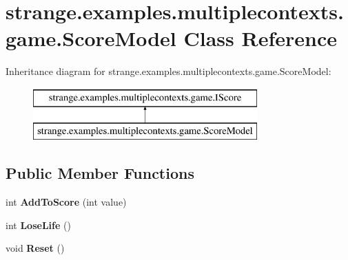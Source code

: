 \hypertarget{classstrange_1_1examples_1_1multiplecontexts_1_1game_1_1_score_model}{\section{strange.\-examples.\-multiplecontexts.\-game.\-Score\-Model Class Reference}
\label{classstrange_1_1examples_1_1multiplecontexts_1_1game_1_1_score_model}
}
Inheritance diagram for strange.\-examples.\-multiplecontexts.\-game.\-Score\-Model\-:\begin{figure}[H]
\begin{center}
\leavevmode
\includegraphics[height=2.000000cm]{classstrange_1_1examples_1_1multiplecontexts_1_1game_1_1_score_model}
\end{center}
\end{figure}
\subsection*{Public Member Functions}
\begin{DoxyCompactItemize}
\item 
\hypertarget{classstrange_1_1examples_1_1multiplecontexts_1_1game_1_1_score_model_a16bba9df1aa11718c747fa0b9119959a}{int {\bfseries Add\-To\-Score} (int value)}\label{classstrange_1_1examples_1_1multiplecontexts_1_1game_1_1_score_model_a16bba9df1aa11718c747fa0b9119959a}

\item 
\hypertarget{classstrange_1_1examples_1_1multiplecontexts_1_1game_1_1_score_model_a346ce922f4a5f71a3bb7f7f108283b93}{int {\bfseries Lose\-Life} ()}\label{classstrange_1_1examples_1_1multiplecontexts_1_1game_1_1_score_model_a346ce922f4a5f71a3bb7f7f108283b93}

\item 
\hypertarget{classstrange_1_1examples_1_1multiplecontexts_1_1game_1_1_score_model_a824e0618d12252ed79bbbdd7282238b0}{void {\bfseries Reset} ()}\label{classstrange_1_1examples_1_1multiplecontexts_1_1game_1_1_score_model_a824e0618d12252ed79bbbdd7282238b0}

\end{DoxyCompactItemize}
